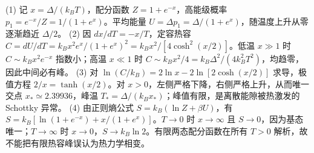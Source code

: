 (1) 记 \(x=\Delta/(k_BT)\)，配分函数 \(Z=1+e^{-x}\)，高能级概率 \(p_1=e^{-x}/Z=1/(1+e^x)\)。平均能量 \(U=\Delta p_1=\Delta/(1+e^x)\)，随温度上升从零逐渐趋近 \(\Delta/2\)。
(2) 因 \(dx/dT=-x/T\)，定容热容 \(C=dU/dT=k_Bx^2e^x/(1+e^x)^2=k_Bx^2/[4\cosh^2(x/2)]\)。低温 \(x\gg1\) 时 \(C\sim k_Bx^2e^{-x}\) 指数小；高温 \(x\ll1\) 时 \(C\sim k_Bx^2/4=k_B\Delta^2/(4k_B^2T^2)\)，均趋零，因此中间必有峰。
(3) 对 \(\ln(C/k_B)=2\ln x-2\ln[2\cosh(x/2)]\) 求导，极值方程 \(2/x=\tanh(x/2)\)。对 \(x>0\)，左侧严格下降，右侧严格上升，从而唯一交点 \(x_*\simeq2.39936\)，峰温 \(T_*=\Delta/(k_Bx_*)\)；峰值有限，是离散能隙被热激发的 Schottky 异常。
(4) 由正则熵公式 \(S=k_B(\ln Z+\beta U)\)，有 \(S=k_B[\ln(1+e^{-x})+x/(1+e^x)]\)。\(T\to0\) 时 \(x\to\infty\) 且 \(S\to0\)，因为基态唯一；\(T\to\infty\) 时 \(x\to0\)，\(S\to k_B\ln2\)。有限两态配分函数在所有 \(T>0\) 解析，故不能把有限热容峰误认为热力学相变。
